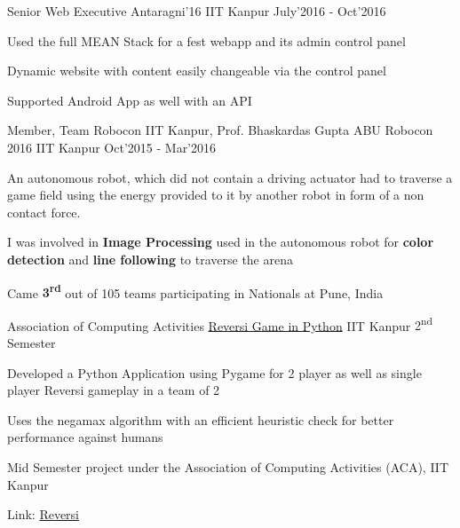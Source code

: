 
\begin{cventries}

  \cventry
  {Senior Web Executive}
  {Antaragni'16}
  {IIT Kanpur}
  {July'2016 - Oct'2016}
  {
    \begin{cvitems}
    \item Used the full MEAN Stack for a fest webapp and its admin control panel
    \item Dynamic website with content easily changeable via the control panel
    \item Supported Android App as well with an API
    \end{cvitems}
  }

  \cventry
  {Member, Team Robocon IIT Kanpur, Prof. Bhaskardas Gupta}
  {ABU Robocon 2016}
  {IIT Kanpur}
  {Oct'2015 - Mar'2016}
  {
    \begin{cvitems}
      \item An autonomous robot, which did not contain a driving actuator had to
        traverse a game field using the energy provided to it by another robot in
        form of a non contact force.
      \item I was involved in \textbf{Image Processing} used in the autonomous
        robot for \textbf{color detection} and \textbf{line following} to
        traverse the arena
      \item Came \textbf{3\textsuperscript{rd}} out of 105 teams participating in Nationals at Pune, India
    \end{cvitems}
  }

  \cventry
  {Association of Computing Activities}
  {\href{http://github.com/yashsriv/Reversi-Python}{Reversi Game in Python}}
  {IIT Kanpur}
  {2\textsuperscript{nd} Semester}
  {
    \begin{cvitems}
    \item Developed a Python Application using Pygame for 2 player as well as
      single player Reversi gameplay in a team of 2
    \item Uses the negamax algorithm with an efficient heuristic check
      for better performance against humans
    \item Mid Semester project under the Association of Computing Activities (ACA), IIT Kanpur
    \item Link: \href{http://github.com/yashsriv/Reversi-Python}{Reversi}
    \end{cvitems}
  }


\end{cventries}

